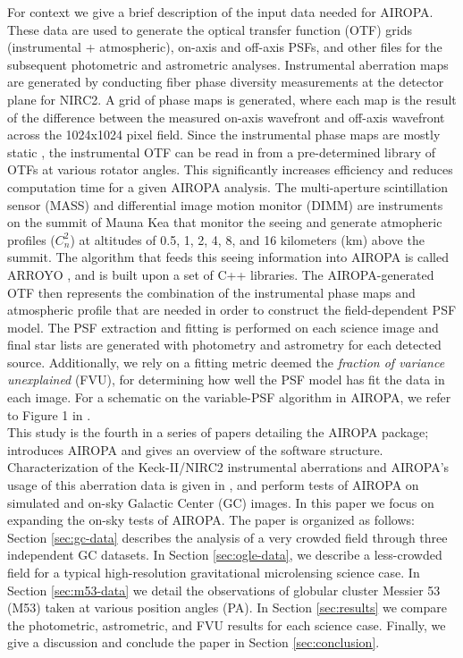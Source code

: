 \documentclass[]{spie}  %
\begin{document}
\indent For context we give a brief description of the input data needed for AIROPA. These data are used to generate the optical transfer function (OTF) grids (instrumental + atmospheric), on-axis and off-axis PSFs, and other files for the subsequent photometric and astrometric analyses. Instrumental aberration maps are generated by conducting fiber phase diversity measurements at the detector plane for NIRC2. A grid of phase maps is generated, where each map is the result of the difference between the measured on-axis wavefront and off-axis wavefront across the 1024x1024 pixel field. Since the instrumental phase maps are mostly static \cite{Ciurlo:inprep}, the instrumental OTF can be read in from a pre-determined library of OTFs at various rotator angles. This significantly increases efficiency and reduces computation time for a given AIROPA analysis. The multi-aperture scintillation sensor (MASS) and differential image motion monitor (DIMM) are instruments on the summit of Mauna Kea that monitor the seeing and generate atmopheric profiles ($C_n^{2}$) at altitudes of 0.5, 1, 2, 4, 8, and 16 kilometers (km) above the summit. The algorithm that feeds this seeing information into AIROPA is called ARROYO \cite{britton:2006a}, and is built upon a set of C++ libraries. The AIROPA-generated OTF then represents the combination of the instrumental phase maps and atmospheric profile that are needed in order to construct the field-dependent PSF model. The PSF extraction and fitting is performed on each science image and final star lists are generated with photometry and astrometry for each detected source. Additionally, we rely on a fitting metric deemed the \textit{fraction of variance unexplained} (FVU), for determining how well the PSF model has fit the data in each image. For a schematic on the variable-PSF algorithm in AIROPA, we refer to Figure 1 in \cite{Turri:inprep}.
\\
\indent This study is the fourth in a series of papers detailing the AIROPA package; \cite{witzel:2016a} introduces AIROPA and gives an overview of the software structure. Characterization of the Keck-II/NIRC2 instrumental aberrations and AIROPA's usage of this aberration data is given in \cite{Ciurlo:inprep}, and \cite{Turri:inprep} perform tests of AIROPA on simulated and on-sky Galactic Center (GC) images. In this paper we focus on expanding the on-sky tests of AIROPA. The paper is organized as follows: Section \ref{sec:gc-data} describes the analysis of a very crowded field through three independent GC datasets. In Section \ref{sec:ogle-data}, we describe a less-crowded field for a typical high-resolution gravitational microlensing science case. In Section \ref{sec:m53-data} we detail the observations of globular cluster Messier 53 (M53) taken at various position angles (PA). In Section \ref{sec:results} we compare the photometric, astrometric, and FVU results for each science case. Finally, we give a discussion and conclude the paper in Section \ref{sec:conclusion}.
\end{document}
